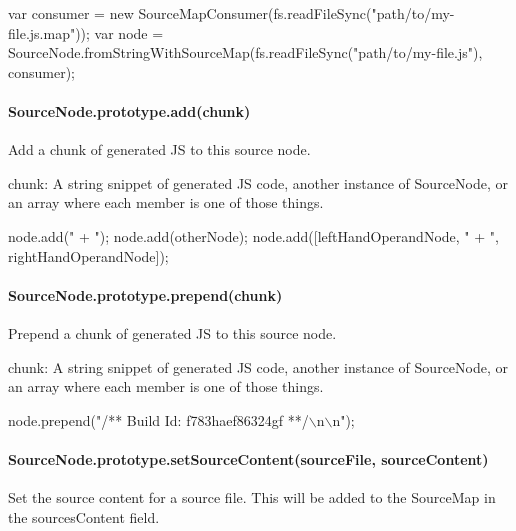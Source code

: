 \begin{DoxyCode}
var consumer = new SourceMapConsumer(fs.readFileSync("path/to/my-file.js.map"));
var node = SourceNode.fromStringWithSourceMap(fs.readFileSync("path/to/my-file.js"),
                                              consumer);
\end{DoxyCode}


\paragraph*{Source\+Node.\+prototype.\+add(chunk)}

Add a chunk of generated JS to this source node.


\begin{DoxyItemize}
\item {\ttfamily chunk}\+: A string snippet of generated JS code, another instance of {\ttfamily Source\+Node}, or an array where each member is one of those things.
\end{DoxyItemize}


\begin{DoxyCode}
node.add(" + ");
node.add(otherNode);
node.add([leftHandOperandNode, " + ", rightHandOperandNode]);
\end{DoxyCode}


\paragraph*{Source\+Node.\+prototype.\+prepend(chunk)}

Prepend a chunk of generated JS to this source node.


\begin{DoxyItemize}
\item {\ttfamily chunk}\+: A string snippet of generated JS code, another instance of {\ttfamily Source\+Node}, or an array where each member is one of those things.
\end{DoxyItemize}


\begin{DoxyCode}
node.prepend("/** Build Id: f783haef86324gf **/\(\backslash\)n\(\backslash\)n");
\end{DoxyCode}


\paragraph*{Source\+Node.\+prototype.\+set\+Source\+Content(source\+File, source\+Content)}

Set the source content for a source file. This will be added to the {\ttfamily Source\+Map} in the {\ttfamily sources\+Content} field.



